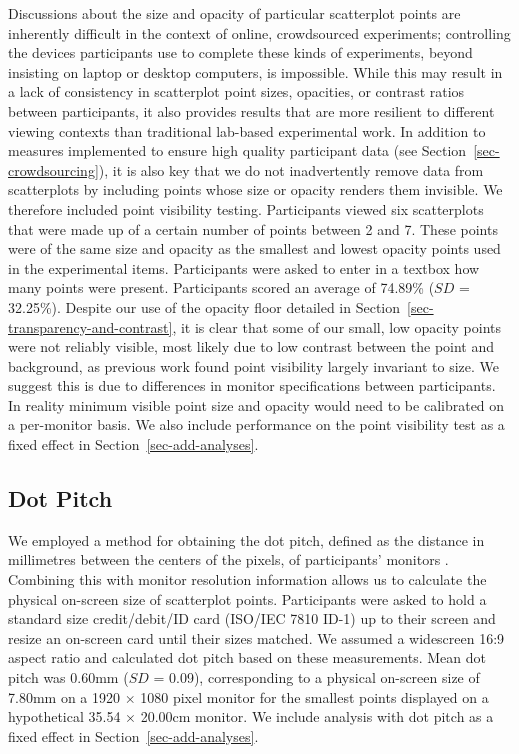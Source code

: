 \documentclass[sigconf]{acmart}
\begin{document}
Discussions about the size and opacity of particular scatterplot points
are inherently difficult in the context of online, crowdsourced
experiments; controlling the devices participants use to complete these
kinds of experiments, beyond insisting on laptop or desktop computers,
is impossible. While this may result in a lack of consistency in
scatterplot point sizes, opacities, or contrast ratios between
participants, it also provides results that are more resilient to
different viewing contexts than traditional lab-based experimental work.
In addition to measures implemented to ensure high quality participant
data (see Section~\ref{sec-crowdsourcing}), it is also key that we do
not inadvertently remove data from scatterplots by including points
whose size or opacity renders them invisible. We therefore included
point visibility testing. Participants viewed six scatterplots that were
made up of a certain number of points between 2 and 7. These points were
of the same size and opacity as the smallest and lowest opacity points
used in the experimental items. Participants were asked to enter in a
textbox how many points were present. Participants scored an average of
74.89\% (\(SD\) = 32.25\%). Despite our use of the opacity floor
detailed in Section~\ref{sec-transparency-and-contrast}, it is clear
that some of our small, low opacity points were not reliably visible,
most likely due to low contrast between the point and background, as
previous work \citep{strain_2023b} found point visibility largely
invariant to size. We suggest this is due to differences in monitor
specifications between participants. In reality minimum visible point
size and opacity would need to be calibrated on a per-monitor basis. We
also include performance on the point visibility test as a fixed effect
in Section~\ref{sec-add-analyses}.

\hypertarget{sec-dot-pitch}{%
\subsection{Dot Pitch}\label{sec-dot-pitch}}

We employed a method for obtaining the dot pitch, defined as the
distance in millimetres between the centers of the pixels, of
participants' monitors \citep{screenscale}. Combining this with monitor
resolution information allows us to calculate the physical on-screen
size of scatterplot points. Participants were asked to hold a standard
size credit/debit/ID card (ISO/IEC 7810 ID-1) up to their screen and
resize an on-screen card until their sizes matched. We assumed a
widescreen 16:9 aspect ratio and calculated dot pitch based on these
measurements. Mean dot pitch was 0.60mm (\(SD\) = 0.09), corresponding
to a physical on-screen size of 7.80mm on a 1920 \(\times\) 1080 pixel
monitor for the smallest points displayed on a hypothetical 35.54
\(\times\) 20.00cm monitor. We include analysis with dot pitch as a
fixed effect in Section~\ref{sec-add-analyses}.
\end{document}
